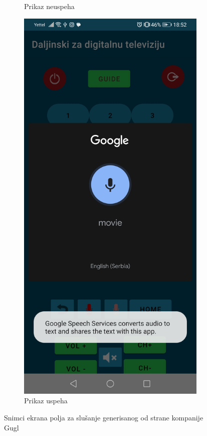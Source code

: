 \documentclass[implementacija.tex]{subfiles}
\begin{document}
\begin{figure}
\begin{subfigure}[b]{0.3\textwidth}
  \caption{Prikaz neuspeha}
  \label{fig:google_neuspesno}
    \end{subfigure}
    \hfill
    \begin{subfigure}[b]{0.3\textwidth}
        \centering
        \includegraphics[width=\textwidth,keepaspectratio]{Implementacija/snimci_ekrana/11_obican_google_uspesno.jpg}
  \caption{Prikaz uspeha}
   \label{fig:google_uspesno}
    \end{subfigure}
    \caption{Snimci ekrana polja za slušanje generisanog od strane kompanije Gugl}
    \label{fig:obavestenja}
\end{figure}
\end{document}
